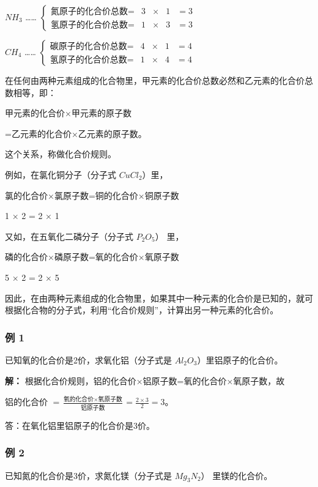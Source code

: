 \(NH_{3}\) \ldots\ldots{}
\(\left\{\begin{array}{lllll} \text{氮原子的化合价总数} = & 3 & \times & 1 & = 3 \\ \text{氢原子的化合价总数} = & 1 & \times & 3 & = 3 \end{array}\right.\)

\(CH_{4}\) \ldots\ldots{}
\(\left\{\begin{array}{lllll} \text{碳原子的化合价总数} = & 4 & \times & 1 & = 4 \\ \text{氢原子的化合价总数} = & 1 & \times & 4 & = 4 \end{array}\right.\)

在任何由两种元素组成的化合物里，甲元素的化合价总数必然和乙元素的化合价总数相等，即：

甲元素的化合价×甲元素的原子数

=乙元素的化合价×乙元素的原子数。

这个关系，称做化合价规则。

例如，在氯化铜分子（分子式 \(CuCl_{2}\)）里，

氯的化合价×氯原子数=铜的化合价×铜原子数

1 × 2 = 2 × 1

又如，在五氧化二磷分子（分子式 \(P_{2}O_{5}\)） 里，

磷的化合价×磷原子数=氧的化合价×氧原子数

5 × 2 = 2 × 5

因此，在由两种元素组成的化合物里，如果其中一种元素的化合价是已知的，就可根据化合物的分子式，利用``化合价规则''，计算出另一种元素的化合价。

\subsubsection{例 1}

已知氧的化合价是2价，求氧化铝（分子式是
\(Al_{2}O_{3}\)）里铝原子的化合价。

\textbf{解：}
根据化合价规则，铝的化合价×铝原子数=氧的化合价×氧原子数，故

铝的化合价
\(=\frac{\text{氧的化合价}\times\text{氧原子数}}{\text{铝原子数}}=\frac{2\times3}{2}=3\)。

答：在氧化铝里铝原子的化合价是3价。

\subsubsection{例 2}

已知氮的化合价是3价，求氮化镁（分子式是 \(Mg_{3}N_{2}\)） 里镁的化合价。

